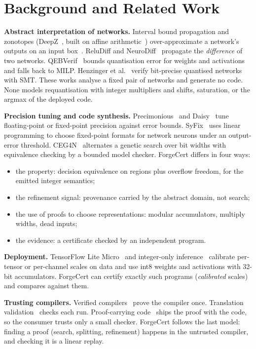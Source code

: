 \documentclass[conference]{IEEEtran}
\begin{document}
\section{Background and Related Work}
\textbf{Abstract interpretation of networks.} Interval bound propagation and zonotopes (DeepZ~\cite{deepz}, built on affine arithmetic~\cite{affine}) over-approximate a network's outputs on an input box~\cite{cousot}. ReluDiff and NeuroDiff~\cite{reludiff,neurodiff} propagate the \emph{difference} of two networks. QEBVerif~\cite{qebverif} bounds quantisation error for weights and activations and falls back to MILP. Henzinger et al.~\cite{qnnverif} verify bit-precise quantised networks with SMT. These works analyse a fixed pair of networks and generate no code. None models requantisation with integer multipliers and shifts, saturation, or the argmax of the deployed code.

\textbf{Precision tuning and code synthesis.} Precimonious~\cite{precimonious} and Daisy~\cite{daisy} tune floating-point or fixed-point precision against error bounds. SyFix~\cite{syfix} uses linear programming to choose fixed-point formats for network neurons under an output-error threshold. CEG4N~\cite{ceg4n} alternates a genetic search over bit widths with equivalence checking by a bounded model checker. ForgeCert differs in four ways:
\begin{itemize}
\item the property: decision equivalence on regions plus overflow freedom, for the emitted integer semantics;
\item the refinement signal: provenance carried by the abstract domain, not search;
\item the use of proofs to choose representations: modular accumulators, multiply widths, dead inputs;
\item the evidence: a certificate checked by an independent program.
\end{itemize}

\textbf{Deployment.} TensorFlow Lite Micro~\cite{tflm} and integer-only inference~\cite{jacob} calibrate per-tensor or per-channel scales on data and use int8 weights and activations with 32-bit accumulators. ForgeCert can certify exactly such programs (\emph{calibrated} scales) and compares against them.

\textbf{Trusting compilers.} Verified compilers~\cite{compcert} prove the compiler once. Translation validation~\cite{pnueli,necula} checks each run. Proof-carrying code~\cite{pcc} ships the proof with the code, so the consumer trusts only a small checker. ForgeCert follows the last model: finding a proof (search, splitting, refinement) happens in the untrusted compiler, and checking it is a linear replay.
\end{document}
